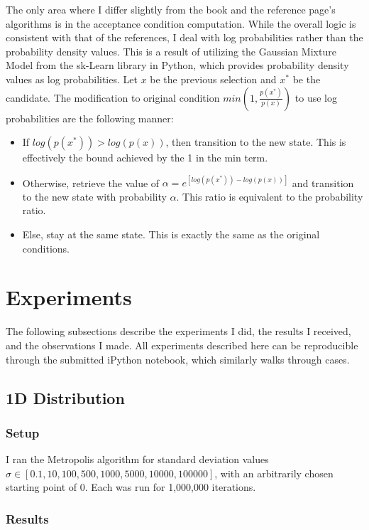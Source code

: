 \documentclass{article} %
\begin{document}
The only area where I differ slightly from the book and the reference page's algorithms is in the acceptance condition computation. While the overall logic is consistent with that of the references, I deal with log probabilities rather than the probability density values. This is a result of utilizing the Gaussian Mixture Model from the sk-Learn library in Python, which provides probability density values as log probabilities. Let \( x \) be the previous selection and \( x^* \) be the candidate. The modification to original condition \(min(1, \frac{p(x^*)}{p(x)})\) to use log probabilities are the following manner:

\begin{itemize}
\item If $ log(p(x^*)) > log(p(x)) $, then transition to the new state. This is effectively the bound achieved by the 1 in the min term.
\item Otherwise, retrieve the value of $ \alpha = e^{[log(p(x^*)) - log(p(x))]} $ and transition to the new state with probability $ \alpha $. This ratio is equivalent to the probability ratio. 
\item Else, stay at the same state. This is exactly the same as the original conditions.
\end{itemize}

\section{Experiments}

The following subsections describe the experiments I did, the results I received, and the observations I made. All experiments described here can be reproducible through the submitted iPython notebook, which similarly walks through cases.

\subsection{1D Distribution}

\subsubsection{Setup}

I ran the Metropolis algorithm for standard deviation values \(\sigma \in{[0.1, 10, 100, 500, 1000, 5000, 10000, 100000]}\), with an arbitrarily chosen starting point of 0. Each was run for 1,000,000 iterations.

\subsubsection{Results}
\end{document}
